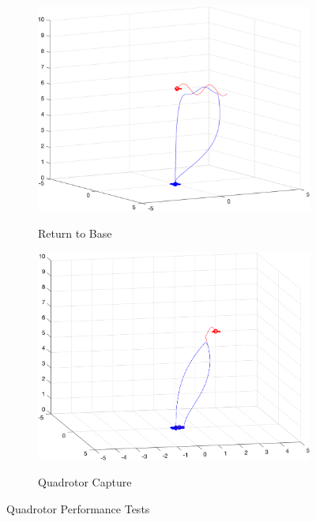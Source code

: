 \documentclass{article}
\begin{document}
\begin{multicols}{2}
\begin{figure}[H]
\begin{subfigure}[b]{0.31\textwidth}
    \includegraphics[width = 1\textwidth]{images/ReturnToBase.png}
     \label{fig:Return}
     \caption{Return to Base}
 \end{subfigure}
\begin{subfigure}[b]{0.31\textwidth}
    \centering
    \includegraphics[width = 1\textwidth]{images/Intercept.png}
     \label{fig:Capture}
     \caption{Quadrotor Capture}
 \end{subfigure}
   \caption{Quadrotor Performance Tests}
\end{figure}

\bigskip

\end{multicols}
\end{document}
